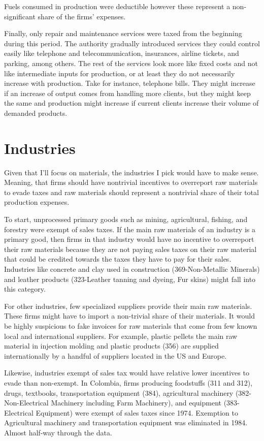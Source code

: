 \documentclass[
  12pt]{article}
\theoremstyle{definition}
\theoremstyle{remark}
\begin{document}
Fuels consumed in production were deductible however these represent a
non-significant share of the firms' expenses.

Finally, only repair and maintenance services were taxed from the
beginning during this period. The authority gradually introduced
services they could control easily like telephone and telecommunication,
insurances, airline tickets, and parking, among others. The rest of the
services look more like fixed costs and not like intermediate inputs for
production, or at least they do not necessarily increase with
production. Take for instance, telephone bills. They might increase if
an increase of output comes from handling more clients, but they might
keep the same and production might increase if current clients increase
their volume of demanded products.

\section{Industries}\label{industries}

Given that I'll focus on materials, the industries I pick would have to
make sense. Meaning, that firms should have nontrivial incentives to
overreport raw materials to evade taxes and raw materials should
represent a nontrivial share of their total production expenses.

To start, unprocessed primary goods such as mining, agricultural,
fishing, and forestry were exempt of sales taxes. If the main raw
materials of an industry is a primary good, then firms in that industry
would have no incentive to overreport their raw materials because they
are not paying sales taxes on their raw material that could be credited
towards the taxes they have to pay for their sales. Industries like
concrete and clay used in construction (369-Non-Metallic Minerals) and
leather products (323-Leather tanning and dyeing, Fur skins) might fall
into this category.

For other industries, few specialized suppliers provide their main raw
materials. These firms might have to import a non-trivial share of their
materials. It would be highly suspicious to fake invoices for raw
materials that come from few known local and international suppliers.
For example, plastic pellets the main raw material in injection molding
and plastic products (356) are supplied internationally by a handful of
suppliers located in the US and Europe.

Likewise, industries exempt of sales tax would have relative lower
incentives to evade than non-exempt. In Colombia, firms producing
foodstuffs (311 and 312), drugs, textbooks, transportation equipment
(384), agricultural machinery (382-Non-Electrical Machinery including
Farm Machinery), and equipment (383-Electrical Equipment) were exempt of
sales taxes since 1974. Exemption to Agricultural machinery and
transportation equipment was eliminated in 1984. Almost half-way through
the data.
\end{document}
